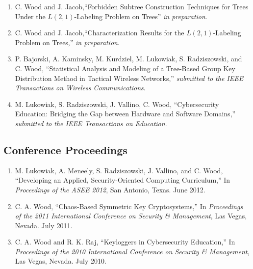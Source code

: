 \documentclass[letterpaper,11pt]{article}
\begin{document}
\begin{enumerate}[J-1.]

\item
	C. Wood and J. Jacob,``Forbidden Subtree Construction Techniques for Trees Under the $L(2,1)$-Labeling Problem on Trees'' {\it in preparation}.

\item 
	C. Wood and J. Jacob,``Characterization Results for the $L(2,1)$-Labeling Problem on Trees,'' {\it in preparation}.

\item
	P. Bajorski, A. Kaminsky, M. Kurdziel, M. Lukowiak, S. Radziszowski, and C. Wood, ``Statistical Analysis and Modeling of a Tree-Based Group Key Distribution Method in Tactical Wireless Networks,'' {\it submitted to the IEEE Transactions on Wireless Communications}.

\item
	M. Lukowiak, S. Radziszowski, J. Vallino, C. Wood, ``Cybersecurity Education: Bridging the Gap between Hardware and Software Domains,'' {\it submitted to the IEEE Transactions on Education}.
\end{enumerate}

\subsection*{Conference Proceedings}
\begin{enumerate}[C-1.]
\item 
	M. Lukowiak, A. Meneely, S. Radziszowski, J. Vallino, and C. Wood, ``Developing an Applied, Security-Oriented Computing Curriculum,'' In {\it Proceedings of the ASEE 2012}, San Antonio, Texas. June 2012.

\item
	C. A. Wood, ``Chaos-Based Symmetric Key Cryptosystems,'' In {\it Proceedings of the 2011 International Conference on Security \& Management}, Las Vegas, Nevada. July 2011.

\item 
	C. A. Wood and R. K. Raj, ``Keyloggers in Cybersecurity Education,'' In {\it Proceedings of the 2010 International Conference on Security \& Management}, Las Vegas, Nevada. July 2010.

\end{enumerate}
\end{document}
